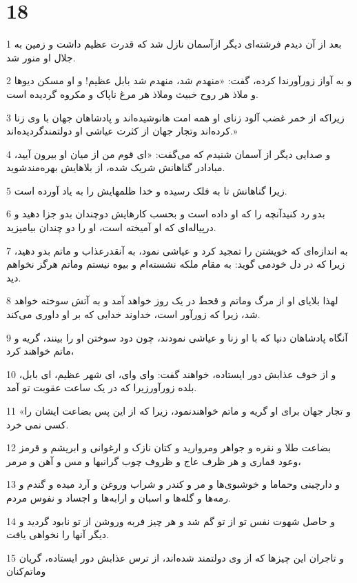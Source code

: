 \chapter{18}

\par 1 بعد از آن دیدم فرشته‌ای دیگر ازآسمان نازل شد که قدرت عظیم داشت و زمین به جلال او منور شد.
\par 2 و به آواز زورآورندا کرده، گفت: «منهدم شد، منهدم شد بابل عظیم! و او مسکن دیوها و ملاذ هر روح خبیث وملاذ هر مرغ ناپاک و مکروه گردیده است.
\par 3 زیراکه از خمر غضب آلود زنای او همه امت هانوشیده‌اند و پادشاهان جهان با وی زنا کرده‌اند وتجار جهان از کثرت عیاشی او دولتمندگردیده‌اند.»
\par 4 و صدایی دیگر از آسمان شنیدم که می‌گفت: «ای قوم من از میان او بیرون آیید، مبادادر گناهانش شریک شده، از بلاهایش بهره‌مندشوید.
\par 5 زیرا گناهانش تا به فلک رسیده و خدا ظلمهایش را به یاد آورده است.
\par 6 بدو رد کنیدآنچه را که او داده است و بحسب کارهایش دوچندان بدو جزا دهید و در‌پیاله‌ای که او آمیخته است، او را دو چندان بیامیزید.
\par 7 به اندازه‌ای که خویشتن را تمجید کرد و عیاشی نمود، به آنقدرعذاب و ماتم بدو دهید، زیرا که در دل خودمی گوید: به مقام ملکه نشسته‌ام و بیوه نیستم وماتم هرگز نخواهم دید.
\par 8 لهذا بلایای او از مرگ وماتم و قحط در یک روز خواهد آمد و به آتش سوخته خواهد شد، زیرا که زورآور است، خداوند خدایی که بر او داوری می‌کند.
\par 9 آنگاه پادشاهان دنیا که با او زنا و عیاشی نمودند، چون دود سوختن او را بینند، گریه و ماتم خواهند کرد،
\par 10 و از خوف عذابش دور ایستاده، خواهند گفت: وای وای، ای شهر عظیم، ای بابل، بلده زورآورزیرا که در یک ساعت عقوبت تو آمد.
\par 11 «و تجار جهان برای او گریه و ماتم خواهندنمود، زیرا که از این پس بضاعت ایشان را کسی نمی خرد.
\par 12 بضاعت طلا و نقره و جواهر ومروارید و کتان نازک و ارغوانی و ابریشم و قرمز وعود قماری و هر ظرف عاج و ظروف چوب گرانبها و مس و آهن و مرمر،
\par 13 و دارچینی وحماما و خوشبوی‌ها و مر و کندر و شراب وروغن و آرد میده و گندم و رمه‌ها و گله‌ها و اسبان و ارابه‌ها و اجساد و نفوس مردم.
\par 14 و حاصل شهوت نفس تو از تو گم شد و هر چیز فربه وروشن از تو نابود گردید و دیگر آنها را نخواهی یافت.
\par 15 و تاجران این چیزها که از وی دولتمند شده‌اند، از ترس عذابش دور ایستاده، گریان وماتم‌کنان
